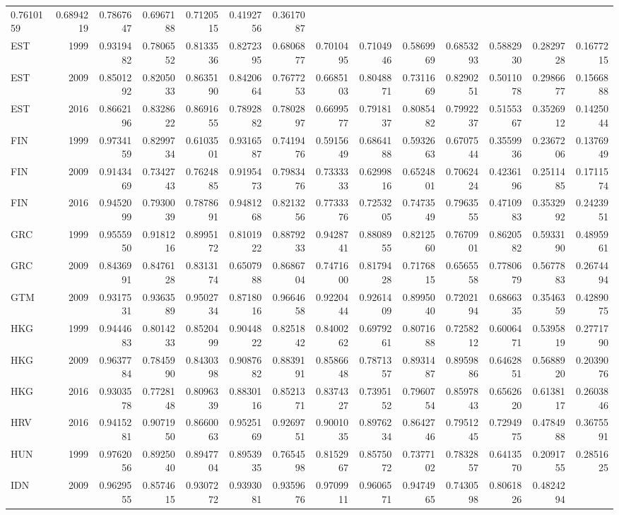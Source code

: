 \documentclass[]{article}
\begin{document}
\begin{longtable}[]{@{}lrrrrrrrrrrrrr@{}}
0.7610159 & 0.6894219 & 0.7867647 & 0.6967188 & 0.7120515 & 0.4192756 &
0.3617087\tabularnewline
EST & 1999 & 0.9319482 & 0.7806552 & 0.8133536 & 0.8272395 & 0.6806877 &
0.7010495 & 0.7104946 & 0.5869969 & 0.6853293 & 0.5882930 & 0.2829728 &
0.1677215\tabularnewline
EST & 2009 & 0.8501292 & 0.8205033 & 0.8635190 & 0.8420664 & 0.7677253 &
0.6685103 & 0.8048871 & 0.7311669 & 0.8290251 & 0.5011078 & 0.2986677 &
0.1566888\tabularnewline
EST & 2016 & 0.8662196 & 0.8328622 & 0.8691655 & 0.7892882 & 0.7802897 &
0.6699577 & 0.7918137 & 0.8085482 & 0.7992237 & 0.5155367 & 0.3526912 &
0.1425044\tabularnewline
FIN & 1999 & 0.9734159 & 0.8299734 & 0.6103501 & 0.9316587 & 0.7419476 &
0.5915649 & 0.6864188 & 0.5932663 & 0.6707544 & 0.3559936 & 0.2367206 &
0.1376949\tabularnewline
FIN & 2009 & 0.9143469 & 0.7342743 & 0.7624885 & 0.9195473 & 0.7983476 &
0.7333333 & 0.6299816 & 0.6524801 & 0.7062424 & 0.4236196 & 0.2511485 &
0.1711574\tabularnewline
FIN & 2016 & 0.9452099 & 0.7930039 & 0.7878691 & 0.9481268 & 0.8213256 &
0.7733376 & 0.7253205 & 0.7473549 & 0.7963555 & 0.4710983 & 0.3532992 &
0.2423951\tabularnewline
GRC & 1999 & 0.9555950 & 0.9181216 & 0.8995172 & 0.8101922 & 0.8879233 &
0.9428741 & 0.8808955 & 0.8212560 & 0.7670901 & 0.8620582 & 0.5933190 &
0.4895961\tabularnewline
GRC & 2009 & 0.8436991 & 0.8476128 & 0.8313174 & 0.6507988 & 0.8686704 &
0.7471600 & 0.8179428 & 0.7176815 & 0.6565558 & 0.7780679 & 0.5677883 &
0.2674494\tabularnewline
GTM & 2009 & 0.9317531 & 0.9363589 & 0.9502734 & 0.8718016 & 0.9664658 &
0.9220444 & 0.9261409 & 0.8995040 & 0.7202194 & 0.6866335 & 0.3546359 &
0.4289075\tabularnewline
HKG & 1999 & 0.9444683 & 0.8014233 & 0.8520499 & 0.9044822 & 0.8251842 &
0.8400262 & 0.6979261 & 0.8071688 & 0.7258212 & 0.6006471 & 0.5395819 &
0.2771790\tabularnewline
HKG & 2009 & 0.9637784 & 0.7845990 & 0.8430398 & 0.9087682 & 0.8839191 &
0.8586648 & 0.7871357 & 0.8931487 & 0.8959886 & 0.6462851 & 0.5688920 &
0.2039076\tabularnewline
HKG & 2016 & 0.9303578 & 0.7728148 & 0.8096339 & 0.8830116 & 0.8521371 &
0.8374327 & 0.7395152 & 0.7960754 & 0.8597843 & 0.6562620 & 0.6138117 &
0.2603846\tabularnewline
HRV & 2016 & 0.9415281 & 0.9071950 & 0.8660063 & 0.9525169 & 0.9269751 &
0.9001035 & 0.8976234 & 0.8642746 & 0.7951245 & 0.7294975 & 0.4784988 &
0.3675591\tabularnewline
HUN & 1999 & 0.9762056 & 0.8925040 & 0.8947704 & 0.8953935 & 0.7654598 &
0.8152967 & 0.8575072 & 0.7377102 & 0.7832857 & 0.6413570 & 0.2091755 &
0.2851625\tabularnewline
IDN & 2009 & 0.9629555 & 0.8574615 & 0.9307272 & 0.9393081 & 0.9359676 &
0.9709911 & 0.9606571 & 0.9474965 & 0.7430598 & 0.8061826 & 0.4824294 &

\end{longtable}
\end{document}
